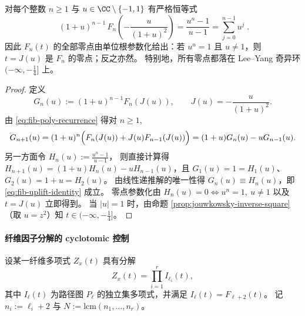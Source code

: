 \begin{theorem}[单位圆提升恒等式]\label{thm:fib-unit-circle-uplift-identity}
对每个整数 \(n\ge 1\) 与 \(u\in\CC\setminus\{-1,1\}\) 有严格恒等式
\begin{equation}\label{eq:fib-uplift-identity}
\boxed{\;
(1+u)^{n-1}\,F_n\!\left(-\frac{u}{(1+u)^2}\right)=\frac{u^n-1}{u-1}
=\sum_{j=0}^{n-1}u^j\; }.
\end{equation}
因此 \(F_n(t)\) 的全部零点由单位根参数化给出：若 \(u^n=1\) 且 \(u\neq 1\)，则 \(t=J(u)\) 是 \(F_n\) 的零点；反之亦然。
特别地，所有零点都落在 Lee--Yang 奇异环 \((-\infty,-\tfrac14]\) 上。
\end{theorem}
\begin{proof}
定义
\[
G_n(u):=(1+u)^{n-1}F_n(J(u)),\qquad J(u)=-\frac{u}{(1+u)^2}.
\]
由 \eqref{eq:fib-poly-recurrence} 得对 \(n\ge 1\),
\[
G_{n+1}(u)=(1+u)^n\Bigl(F_n(J(u))+J(u)F_{n-1}(J(u))\Bigr)
=(1+u)G_n(u)-uG_{n-1}(u).
\]
另一方面令
\(
H_n(u):=\frac{u^n-1}{u-1}
\)，
则直接计算得 \(H_{n+1}(u)=(1+u)H_n(u)-uH_{n-1}(u)\)，且 \(G_1(u)=1=H_1(u)\)、\(G_2(u)=1+u=H_2(u)\)。
由线性递推解的唯一性得 \(G_n(u)\equiv H_n(u)\)，即 \eqref{eq:fib-uplift-identity} 成立。
零点参数化由 \(H_n(u)=0\iff u^n=1,\ u\ne 1\) 以及 \(t=J(u)\) 立即得到。
当 \(|u|=1\) 时，由命题 \ref{prop:jouwkowsky-inverse-square}（取 \(u=z^2\)）知 \(t\in(-\infty,-\tfrac14]\)。
\end{proof}



\paragraph{纤维因子分解的 cyclotomic 控制}
设某一纤维多项式 \(Z_x(t)\) 具有分解
\begin{equation}\label{eq:fiber-factorization}
Z_x(t)=\prod_{i=1}^{r} I_{\ell_i}(t),
\end{equation}
其中 \(I_{\ell}(t)\) 为路径图 \(P_{\ell}\) 的独立集多项式，并满足 \(I_{\ell}(t)=F_{\ell+2}(t)\)。
记 \(n_i:=\ell_i+2\) 与 \(N:=\mathrm{lcm}(n_1,\dots,n_r)\)。

